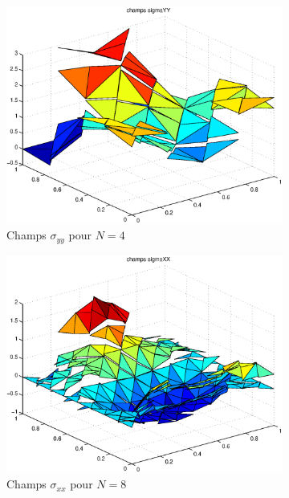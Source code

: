 \begin{figure}[h!]
\begin{subfigure}[b]{0.32\textwidth}
  \includegraphics[width=\textwidth]{images/sigmayyN4.eps}
  \caption{Champs $\sigma_{yy}$ pour $N=4$}
  \end{subfigure}
  \begin{subfigure}[b]{0.32\textwidth}
  \includegraphics[width=\textwidth]{images/sigmaxxN8.eps}
  \caption{Champs $\sigma_{xx}$ pour $N=8$}
  \end{subfigure}
  ~
  \begin{subfigure}[b]{0.32\textwidth}

\end{subfigure}
\end{figure}
